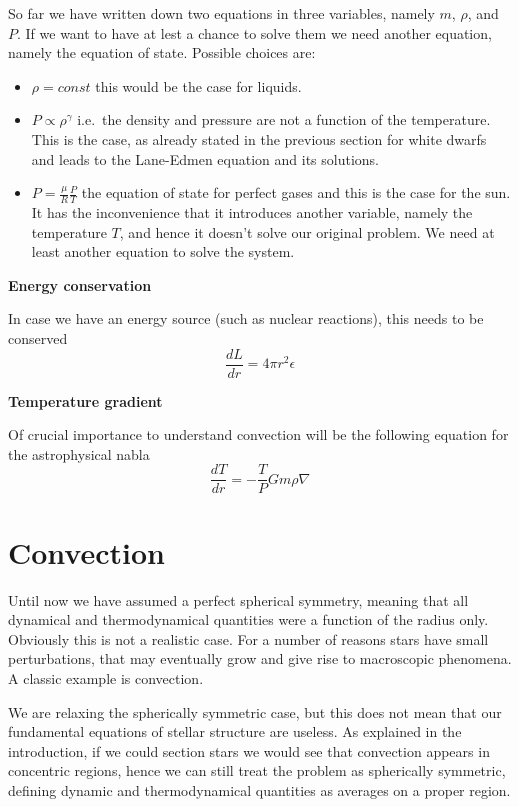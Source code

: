So far we have written down two equations in three variables, namely $m$, $\rho$, and $P$. If we want to have at lest a chance to solve them we need another equation, namely the equation of state. Possible choices are:
\begin{itemize}
	\item $\rho=const$ this would be the case for liquids.
	\item $P\propto \rho^\gamma$ i.e.\ the density and pressure are not a function of the temperature. This is the case, as already stated in the previous section for white dwarfs and leads to the Lane-Edmen equation and its solutions.
	\item $P=\frac{\mu}{R}\frac{P}{T}$ the equation of state for perfect gases and this is the case for the sun. It has the inconvenience that it introduces another variable, namely the temperature $T$, and hence it doesn't solve our original problem. We need at least another equation to solve the system. 
\end{itemize}

\textbf{Energy conservation} 

In case we have an energy source (such as nuclear reactions), this needs to be conserved
\begin{equation}\label{energycons}
	\frac{dL}{dr} = 4 \pi r^2 \epsilon
\end{equation}

\textbf{Temperature gradient} 

Of crucial importance to understand convection will be the following equation for the astrophysical nabla
\begin{equation}\label{energytransfer}
\frac{d T}{d r} = - \frac{T }{P} G m \rho\nabla
\end{equation}


\section{Convection}
Until now we have assumed a perfect spherical symmetry, meaning that all dynamical and thermodynamical quantities were a function of the radius only. Obviously this is not a realistic case. For a number of reasons stars have small perturbations, that may eventually grow and give rise to macroscopic phenomena. A classic example is convection.

We are relaxing the spherically symmetric case, but this does not mean that our fundamental equations of stellar structure are useless. As explained in the introduction, if we could section stars we would see that convection appears in concentric regions, hence  we can still treat the problem as spherically symmetric, defining dynamic and thermodynamical quantities as averages on a proper region. 

